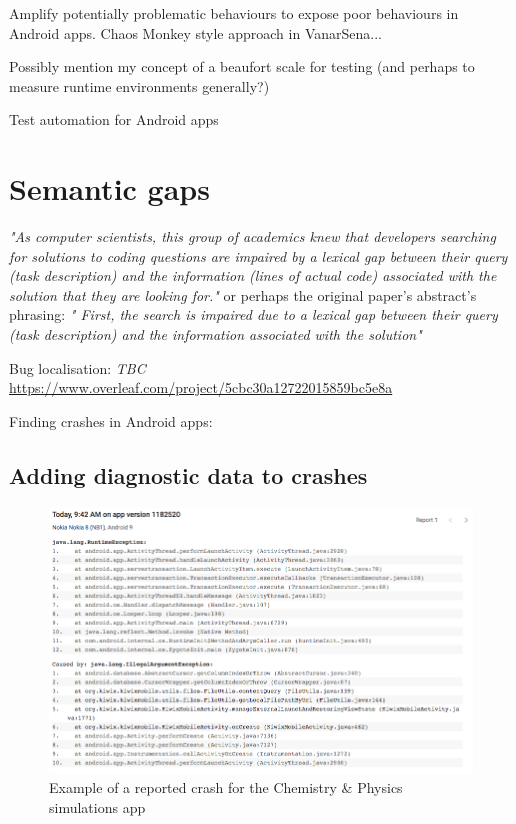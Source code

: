 Amplify potentially problematic behaviours to expose poor behaviours in Android apps\cite{yang2013testing}. Chaos Monkey style approach in VanarSena...

Possibly mention my concept of a beaufort scale for testing (and perhaps to measure runtime environments generally?)\cite{harty_beaufort_scale_2018}

Test automation for Android apps\cite{SLR_automated_testing_android_apps_2019}

\section{Semantic gaps}
\emph{"As computer scientists, this group of academics knew that developers searching for solutions to coding questions are impaired by a lexical gap between their query (task description) and the information (lines of actual code) associated with the solution that they are looking for."}\cite{popper_crokage_2019}
 or perhaps the original paper's abstract's phrasing: 
\emph{" First, the search is impaired due to a lexical gap between their query (task description) and the information associated with the solution"}\cite{Silva:2019:RCS:3339076.3339130}

Bug localisation: \textit{TBC}
\url{https://www.overleaf.com/project/5cbc30a12722015859bc5e8a}

Finding crashes in Android apps: 

\subsection{Adding diagnostic data to crashes}

\begin{figure}
    \centering
    \includegraphics[angle=90,origin=c,trim={0.2cm 0 0.8cm 0},clip, width=\textwidth,height=\textheight,keepaspectratio]{images/PHeT_Example_Crash_StackTrace(2019-Jun-14).png}
    \caption{Example of a reported crash for the Chemistry \& Physics simulations app}
    \label{fig:phet_stack_trace}
\end{figure}

